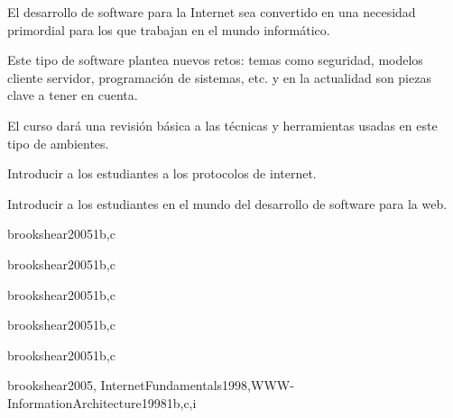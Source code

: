 \begin{syllabus}


\begin{justification}
El desarrollo de software para la Internet sea convertido en una necesidad primordial para los que trabajan en el mundo informático.

Este tipo de software plantea nuevos retos: temas como seguridad, modelos cliente servidor, programación de sistemas, etc. y en la actualidad son piezas clave a tener en cuenta.

El curso dará una revisión básica a las técnicas y herramientas usadas en este tipo de ambientes.
\end{justification}

\begin{goals}
\item Introducir a los estudiantes a los protocolos de internet.
\item Introducir a los estudiantes en el mundo del desarrollo de software para la web.
\end{goals}



\begin{unit}{\NCIntroductionDef}{}{brookshear2005}{1}{b,c}
   \NCIntroductionAllTopics
   \NCIntroductionAllObjectives
\end{unit}

\begin{unit}{\NCNetworkCommunicationDef}{}{brookshear2005}{1}{b,c}
   \NCNetworkCommunicationAllTopics
   \NCNetworkCommunicationAllObjectives
\end{unit}

\begin{unit}{\NCNetworkSecurityDef}{}{brookshear2005}{1}{b,c}
   \NCNetworkSecurityAllTopics
   \NCNetworkSecurityAllObjectives
\end{unit}

\begin{unit}{\NCCompressionDef}{}{brookshear2005}{1}{b,c}
   \NCCompressionAllTopics
   \NCCompressionAllObjectives
\end{unit}

\begin{unit}{\NCNetworkManagementDef}{}{brookshear2005}{1}{b,c}
   \NCNetworkManagementAllTopics
   \NCNetworkManagementAllObjectives
\end{unit}

\begin{unit}{\SEToolsAndEnvironmentsDef}{}{brookshear2005, InternetFundamentals1998,WWW-InformationArchitecture1998}{1}{b,c,i}
   \SEToolsAndEnvironmentsAllTopics
   \SEToolsAndEnvironmentsAllObjectives
\end{unit}


\end{syllabus}
